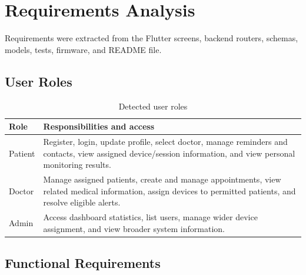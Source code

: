 \chapter{Requirements Analysis}

Requirements were extracted from the Flutter screens, backend routers, schemas, models, tests, firmware, and README file.

\section{User Roles}

\begin{table}[H]
\centering
\caption{Detected user roles}
\begin{tabular}{p{} p{}}
\toprule
\textbf{Role} & \textbf{Responsibilities and access}\\
\midrule
Patient & Register, login, update profile, select doctor, manage reminders and contacts, view assigned device/session information, and view personal monitoring results.\\
Doctor & Manage assigned patients, create and manage appointments, view related medical information, assign devices to permitted patients, and resolve eligible alerts.\\
Admin & Access dashboard statistics, list users, manage wider device assignment, and view broader system information.\\
\bottomrule
\end{tabular}
\end{table}

\section{Functional Requirements}

